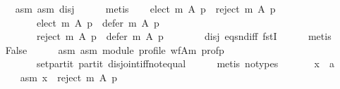 \begin{isabellebody}
\ \ \ \ \isamarkupfalse%
\ asm{}\ asm{}\ disj\isanewline
\ \ \ \ \isamarkupfalse%
\ metis\isanewline
\ \ \isamarkupfalse%
\ {\isachardoublequoteopen}{\isacharparenleft}{\kern0pt}{\isacharparenleft}{\kern0pt}elect\ m\ A\ p{\isacharparenright}{\kern0pt}\ {\isasyminter}\ {\isacharparenleft}{\kern0pt}reject\ m\ A\ p{\isacharparenright}{\kern0pt}\ {\isacharequal}{\kern0pt}\ {\isacharbraceleft}{\kern0pt}{\isacharbraceright}{\kern0pt}{\isacharparenright}{\kern0pt}\ {\isasymand}\isanewline
\ \ \ \ \ \ \ \ \ \ {\isacharparenleft}{\kern0pt}{\isacharparenleft}{\kern0pt}elect\ m\ A\ p{\isacharparenright}{\kern0pt}\ {\isasyminter}\ {\isacharparenleft}{\kern0pt}defer\ m\ A\ p{\isacharparenright}{\kern0pt}\ {\isacharequal}{\kern0pt}\ {\isacharbraceleft}{\kern0pt}{\isacharbraceright}{\kern0pt}{\isacharparenright}{\kern0pt}\ {\isasymand}\isanewline
\ \ \ \ \ \ \ \ \ \ {\isacharparenleft}{\kern0pt}{\isacharparenleft}{\kern0pt}reject\ m\ A\ p{\isacharparenright}{\kern0pt}\ {\isasyminter}\ {\isacharparenleft}{\kern0pt}defer\ m\ A\ p{\isacharparenright}{\kern0pt}\ {\isacharequal}{\kern0pt}\ {\isacharbraceleft}{\kern0pt}{\isacharbraceright}{\kern0pt}{\isacharparenright}{\kern0pt}{\isachardoublequoteclose}\isanewline
\ \ \ \ \isamarkupfalse%
\ disj{}\ eq{\isacharunderscore}{\kern0pt}snd{\isacharunderscore}{\kern0pt}iff\ fstI\isanewline
\ \ \ \ \isamarkupfalse%
\ metis\isanewline
\ \ \isamarkupfalse%
\ {\isachardoublequoteopen}False{\isachardoublequoteclose}\isanewline
\ \ \ \ \isamarkupfalse%
\ asm{}\ asm{}\ module\ profile\ wf{\isacharunderscore}{\kern0pt}A{\isacharunderscore}{\kern0pt}m\ prof{\isacharunderscore}{\kern0pt}p\isanewline
\ \ \ \ \ \ \ \ \ \ set{\isacharunderscore}{\kern0pt}partit\ partit\ disjoint{\isacharunderscore}{\kern0pt}iff{\isacharunderscore}{\kern0pt}not{\isacharunderscore}{\kern0pt}equal\isanewline
\ \ \ \ \isamarkupfalse%
\ {\isacharparenleft}{\kern0pt}metis\ {\isacharparenleft}{\kern0pt}no{\isacharunderscore}{\kern0pt}types{\isacharparenright}{\kern0pt}{\isacharparenright}{\kern0pt}\isanewline
{}\isamarkupfalse%
\isanewline
\ \ \isamarkupfalse%
\isanewline
\ \ \ \ x\ {\isacharcolon}{\kern0pt}{\isacharcolon}{\kern0pt}\ {\isachardoublequoteopen}{\isacharprime}{\kern0pt}a{\isachardoublequoteclose}\isanewline
\ \ \isamarkupfalse%
\isanewline
\ \ \ \ asm{}{\isacharcolon}{\kern0pt}\ {\isachardoublequoteopen}x\ {\isasymin}\ reject\ m\ A\ p{\isachardoublequoteclose}\ \isanewline

\end{isabellebody}
